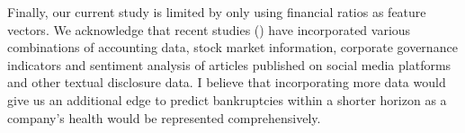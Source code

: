 Finally, our current study is limited by only using financial ratios as feature vectors. We acknowledge that recent studies (\cite{dyer2017evolution,hosaka2019bankruptcy,tinoco2013financial}) have incorporated various combinations of accounting data, stock market information, corporate governance indicators and sentiment analysis of articles published on social media platforms and other textual disclosure data. 
I believe that incorporating more data would give us an additional edge to predict bankruptcies within a shorter horizon as a company's health would be represented comprehensively.





